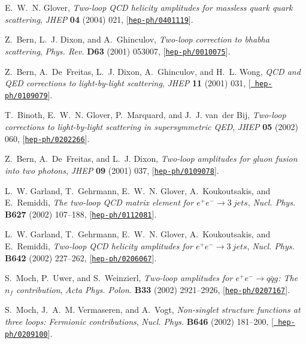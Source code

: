 \documentclass[paper,notoc,nohyper]{JHEP3}
\begin{document}
\begin{thebibliography}{10}
E.~W.~N. Glover, {\it Two-loop {QCD} helicity amplitudes for massless quark
  quark scattering},  {\em JHEP} {\bf 04} (2004) 021,
  [\href{http://xxx.lanl.gov/abs/hep-ph/0401119}{{\tt hep-ph/0401119}}].

Z.~Bern, L.~J. Dixon, and A.~Ghinculov, {\it Two-loop correction to bhabha
  scattering},  {\em Phys. Rev.} {\bf D63} (2001) 053007,
  [\href{http://xxx.lanl.gov/abs/hep-ph/0010075}{{\tt hep-ph/0010075}}].

Z.~Bern, A.~De~Freitas, L.~J. Dixon, A.~Ghinculov, and H.~L. Wong, {\it {QCD}
  and {QED} corrections to light-by-light scattering},  {\em JHEP} {\bf 11}
  (2001) 031, [\href{http://xxx.lanl.gov/abs/hep-ph/0109079}{{\tt
  hep-ph/0109079}}].

T.~Binoth, E.~W.~N. Glover, P.~Marquard, and J.~J. van~der Bij, {\it Two-loop
  corrections to light-by-light scattering in supersymmetric {QED}},  {\em
  JHEP} {\bf 05} (2002) 060,
  [\href{http://xxx.lanl.gov/abs/hep-ph/0202266}{{\tt hep-ph/0202266}}].

Z.~Bern, A.~De~Freitas, and L.~J. Dixon, {\it Two-loop amplitudes for gluon
  fusion into two photons},  {\em JHEP} {\bf 09} (2001) 037,
  [\href{http://xxx.lanl.gov/abs/hep-ph/0109078}{{\tt hep-ph/0109078}}].

L.~W. Garland, T.~Gehrmann, E.~W.~N. Glover, A.~Koukoutsakis, and E.~Remiddi,
  {\it The two-loop {QCD} matrix element for $e^+ e^- \rightarrow 3~jets$},
  {\em Nucl. Phys.} {\bf B627} (2002) 107--188,
  [\href{http://xxx.lanl.gov/abs/hep-ph/0112081}{{\tt hep-ph/0112081}}].

L.~W. Garland, T.~Gehrmann, E.~W.~N. Glover, A.~Koukoutsakis, and E.~Remiddi,
  {\it Two-loop {QCD} helicity amplitudes for $e^+ e^- \rightarrow 3~jets$},
  {\em Nucl. Phys.} {\bf B642} (2002) 227--262,
  [\href{http://xxx.lanl.gov/abs/hep-ph/0206067}{{\tt hep-ph/0206067}}].

S.~Moch, P.~Uwer, and S.~Weinzierl, {\it Two-loop amplitudes for $e^+ e^-
  \rightarrow q\bar{q} g$: The $n_f$ contribution},  {\em Acta Phys. Polon.}
  {\bf B33} (2002) 2921--2926,
  [\href{http://xxx.lanl.gov/abs/hep-ph/0207167}{{\tt hep-ph/0207167}}].

S.~Moch, J.~A.~M. Vermaseren, and A.~Vogt, {\it Non-singlet structure functions
  at three loops: Fermionic contributions},  {\em Nucl. Phys.} {\bf B646}
  (2002) 181--200, [\href{http://xxx.lanl.gov/abs/hep-ph/0209100}{{\tt
  hep-ph/0209100}}].


\end{thebibliography}
\end{document}
